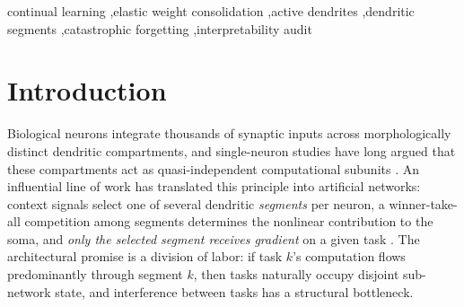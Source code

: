 \documentclass[review,12pt,number]{elsarticle}
\begin{document}
\begin{frontmatter}
\begin{abstract}
constant bias on the own-segment dendritic input raises the learning term
in every cell of a $\{$dataset$\}\times\{$depth$\}\times\{$granularity$\}$
grid ($\Delta\ell>0$ in $20/20$ dose cells, significant in $18/20$ at
$n{=}10$ paired), with final accuracy improving in step ($17/20$
simultaneously significant, and every grid cell significant on both terms
at some dose; $\Delta\ell$ up to $+4.6$, $t(9){=}8.1$); forgetting is
reduced at $T{=}10$ ($\Delta\mathrm{BWT}$ up to $+1.7$) and mildly traded
back at $T{=}20$ (significant in $3/8$ cells). Signed-drift
instrumentation shows the network never counteracts the bias at the
parameter level; the own-segment win rate saturates at $0.13$--$0.19$
regardless of dose because any effective dose dominates the raw gate
scale --- partial restoration suffices. Segment--task
specialization in this architecture family is thus not a weak tendency but an
actively violated assumption --- and a repairable one.
\end{abstract}

\begin{keyword}
continual learning \sep elastic weight consolidation \sep active dendrites
\sep dendritic segments \sep catastrophic forgetting \sep interpretability
audit
\end{keyword}

\end{frontmatter}

\linenumbers

\section{Introduction}
\label{sec:intro}

Biological neurons integrate thousands of synaptic inputs across morphologically
distinct dendritic compartments, and single-neuron studies have long argued
that these compartments act as quasi-independent computational subunits
\cite{poirazi2003,london2005,poirazi2020}. An influential line of work has
translated this principle into artificial networks: context signals select
one of several dendritic \emph{segments} per neuron, a winner-take-all
competition among segments determines the nonlinear contribution to the
soma, and \emph{only the selected segment receives gradient} on a given task
\cite{iyer2022}. The architectural promise is a division of labor: if task
$k$'s computation flows predominantly through segment $k$, then tasks
naturally occupy disjoint sub-network state, and interference between tasks
has a structural bottleneck.
\end{document}
